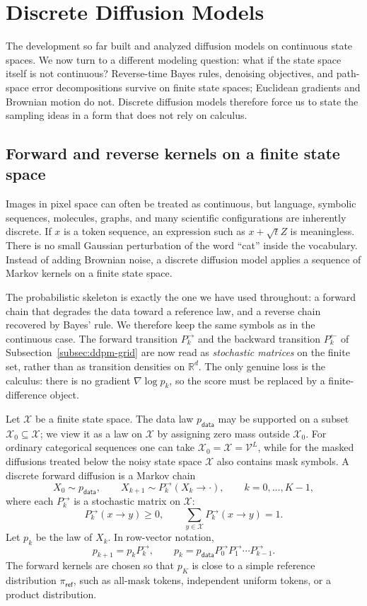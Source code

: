 \documentclass[10pt,a4paper]{amsart}
\numberwithin{equation}{section}
\newcommand{\R}{\mathbb{R}}
\newcommand{\cX}{\mathcal{X}}
\newcommand{\mc}[1]{\mathcal{#1}}
\newcommand{\pdata}{p_{\mathsf{data}}}
\begin{document}
\section{Discrete Diffusion Models}
\label{sec:discrete}

The development so far built and analyzed diffusion models on continuous state
spaces.  We now turn to a different modeling question: what if the state space
itself is not continuous?  Reverse-time Bayes rules, denoising objectives, and
path-space error decompositions survive on finite state spaces; Euclidean
gradients and Brownian motion do not.  Discrete diffusion models therefore force
us to state the sampling ideas in a form that does not rely on calculus.

\subsection{Forward and reverse kernels on a finite state space}

Images in pixel space can often be treated as continuous, but language,
symbolic sequences, molecules, graphs, and many scientific configurations are
inherently discrete.  If $x$ is a token sequence, an expression such as
$x+\sqrt t Z$ is meaningless.  There is no small Gaussian perturbation of the
word ``cat'' inside the vocabulary.  Instead of adding Brownian noise, a
discrete diffusion model applies a sequence of Markov kernels on a finite state
space.

The
probabilistic skeleton is exactly the one we have used throughout: a forward
chain that degrades the data toward a reference law, and a reverse chain
recovered by Bayes' rule.  We therefore keep the same symbols as in the
continuous case.  The forward transition $P_k^{\to}$ and the backward
transition $P_k^{\leftarrow}$ of Subsection~\ref{subsec:ddpm-grid} are now read
as \emph{stochastic matrices} on the finite set, rather than as transition
densities on $\R^d$.  The only genuine loss is the calculus: there
is no gradient $\nabla\log p_k$, so the score must be replaced by a
finite-difference object.

Let $\cX$ be a finite state space.  The data law $\pdata$ may be
supported on a subset $\cX_0\subseteq\cX$; we view it as a
law on $\cX$ by assigning zero mass outside $\cX_0$.  For ordinary
categorical sequences one can take $\cX_0=\cX=\mc{V}^L$, while
for the masked diffusions treated below the noisy state space $\cX$ also
contains mask symbols.  A
discrete forward diffusion is a Markov chain
\begin{equation}\label{eq:discrete-forward}
    X_0\sim \pdata,\qquad
    X_{k+1}\sim P_k^{\to}(X_k \to \cdot),
    \qquad k=0,\ldots,K-1,
\end{equation}
where each $P_k^{\to}$ is a stochastic matrix on $\cX$:
\[
    P_k^{\to}(x \to y)\geq0,\qquad
    \sum_{y\in\cX}P_k^{\to}(x \to y)=1.
\]
Let $p_k$ be the law of $X_k$.  In row-vector notation,
\[
    p_{k+1}=p_kP_k^{\to},\qquad
    p_k=\pdata P_0^{\to}P_1^{\to}\cdots P_{k-1}^{\to}.
\]
The forward kernels are chosen so that $p_K$ is close to a simple reference
distribution $\pi_{\mathsf{ref}}$, such as all-mask tokens, independent uniform
tokens, or a product distribution.
\end{document}

